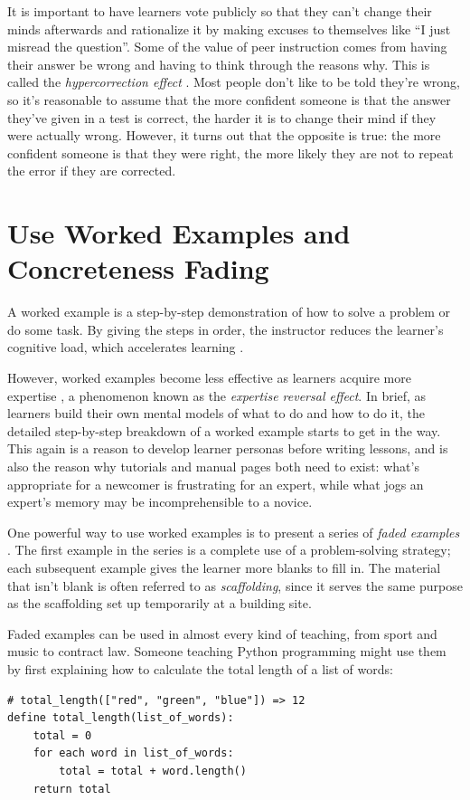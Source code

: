\documentclass[10pt,letterpaper]{article}
\newcommand{\rulemajor}[1]{\section{#1}}
\begin{document}
It is important to have learners vote publicly so that they can't change their
minds afterwards and rationalize it by making excuses to themselves like ``I just
misread the question''.  Some of the value of peer instruction comes from having
their answer be wrong and having to think through the reasons why.  This is
called the \emph{hypercorrection effect} \cite{Metc2016}. Most people don't like
to be told they're wrong, so it's reasonable to assume that the more confident
someone is that the answer they've given in a test is correct, the harder it is
to change their mind if they were actually wrong.  However, it turns out that
the opposite is true: the more confident someone is that they were right, the
more likely they are not to repeat the error if they are corrected.

\rulemajor{Use Worked Examples and Concreteness Fading}

A worked example is a step-by-step demonstration of how to solve a problem or do
some task.  By giving the steps in order, the instructor reduces the learner's
cognitive load, which accelerates learning \cite{Atki2000,Paas2003}.

However, worked examples become less effective as learners acquire more
expertise \cite{Kaly2003,Kaly2007}, a phenomenon known as the \emph{expertise
  reversal effect}.  In brief, as learners build their own mental models of what
to do and how to do it, the detailed step-by-step breakdown of a worked example
starts to get in the way.  This again is a reason to develop learner personas
before writing lessons, and is also the reason why tutorials and manual pages
both need to exist: what's appropriate for a newcomer is frustrating for an
expert, while what jogs an expert's memory may be incomprehensible to a novice.

One powerful way to use worked examples is to present a series of \emph{faded
  examples} \cite{Schw2009}.  The first example in the series is a complete use
of a problem-solving strategy; each subsequent example gives the learner more
blanks to fill in. The material that isn't blank is often referred to as
\emph{scaffolding}, since it serves the same purpose as the scaffolding set up
temporarily at a building site.

Faded examples can be used in almost every kind of teaching, from sport and
music to contract law. Someone teaching Python programming might use them by
first explaining how to calculate the total length of a list of words:

\begin{verbatim}
# total_length(["red", "green", "blue"]) => 12
define total_length(list_of_words):
    total = 0
    for each word in list_of_words:
        total = total + word.length()
    return total
\end{verbatim}
\end{document}

